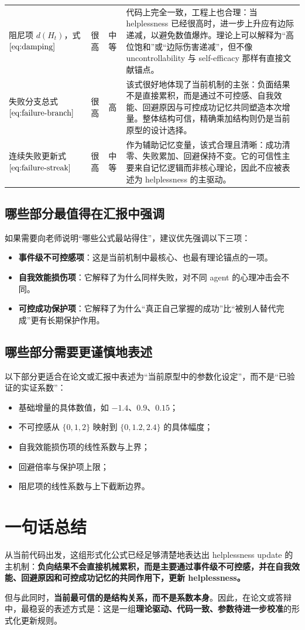 \documentclass[11pt]{article}
\begin{document}
\begin{longtable}{L{2.8cm}L{1.8cm}L{1.8cm}L{8.0cm}}
阻尼项 $d(H_t)$，式 $\eqref{eq:damping}$ & 很高 & 中等 &
代码上完全一致，工程上也合理：当 helplessness 已经很高时，进一步上升应有边际递减，以避免数值爆炸。理论上可以解释为“高位饱和”或“边际伤害递减”，但不像 uncontrollability 与 self-efficacy 那样有直接文献锚点。 \\

失败分支总式 $\eqref{eq:failure-branch}$ & 很高 & 高 &
该式很好地体现了当前机制的主张：负面结果不是直接累积，而是通过不可控感、自我效能、回避原因与可控成功记忆共同塑造本次增量。整体结构可信，精确乘加结构则仍是当前原型的设计选择。 \\

连续失败更新式 $\eqref{eq:failure-streak}$ & 很高 & 中等 &
作为辅助记忆变量，该式合理且清晰：成功清零、失败累加、回避保持不变。它的可信性主要来自记忆逻辑而非核心理论，因此不应被表述为 helplessness 的主驱动。 \\

\end{longtable}

\subsection{哪些部分最值得在汇报中强调}
如果需要向老师说明“哪些公式最站得住”，建议优先强调以下三项：
\begin{itemize}
    \item \textbf{事件级不可控感项}：这是当前机制中最核心、也最有理论锚点的一项。
    \item \textbf{自我效能损伤项}：它解释了为什么同样失败，对不同 agent 的心理冲击会不同。
    \item \textbf{可控成功保护项}：它解释了为什么“真正自己掌握的成功”比“被别人替代完成”更有长期保护作用。
\end{itemize}

\subsection{哪些部分需要更谨慎地表述}
以下部分更适合在论文或汇报中表述为“当前原型中的参数化设定”，而不是“已验证的实证系数”：
\begin{itemize}
    \item 基础增量的具体数值，如 $-1.4$、$0.9$、$0.15$；
    \item 不可控感从 $\{0,1,2\}$ 映射到 $\{0,1.2,2.4\}$ 的具体幅度；
    \item 自我效能损伤项的线性系数与上界；
    \item 回避倍率与保护项上限；
    \item 阻尼项的线性系数与上下截断边界。
\end{itemize}

\section{一句话总结}
从当前代码出发，这组形式化公式已经足够清楚地表达出 helplessness update 的主机制：\textbf{负向结果不会直接机械累积，而是主要通过事件级不可控感，并在自我效能、回避原因和可控成功记忆的共同作用下，更新 helplessness。}

但与此同时，\textbf{当前最可信的是结构关系，而不是系数本身}。因此，在论文或答辩中，最稳妥的表述方式是：这是一组\textbf{理论驱动、代码一致、参数待进一步校准}的形式化更新规则。
\end{document}
